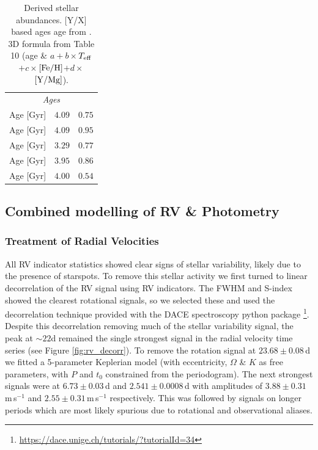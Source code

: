 \documentclass[fleqn,usenatbib]{mnras}
\newcommand{\ms}{m\,s$^{-1}$}
\newcommand{\teff}{$T_{\rm eff}$}
\newcommand{\feh}{\mbox{$\rm [Fe/H]$}}
\newcommand{\ymg}{\mbox{$\rm [Y/Mg]$}}
\begin{document}
\begin{table}
\begin{tabular}{lcc}
        \hline
        \multicolumn{3}{c}{\it Ages}\\
        [Y/Mg] Age [Gyr]  & $ 4.09 $ & $ 0.75 $ \\
        [Y/Ti] Age [Gyr]  & $ 4.09 $ & $ 0.95 $ \\
        [Y/Zn] Age [Gyr]  & $ 3.29 $ & $ 0.77 $ \\
        [Y/Si] Age [Gyr]  & $ 3.95 $ & $ 0.86 $ \\
        [Y/Al] Age [Gyr]  & $ 4.00 $ & $ 0.54 $ \\
        \hline
        \hline
    \end{tabular}
    \caption{Derived stellar abundances. [Y/X] based ages age from \citet{Delgado-19}. 3D formula from Table 10 (age \&  $a + b \times$\teff{}$+ c \times$\feh{}$ + d \times$\ymg{}).}
    \label{tab:abunds}
\end{table}


\subsection{Combined modelling of RV \& Photometry}

\subsubsection{Treatment of Radial Velocities}
All RV indicator statistics showed clear signs of stellar variability, likely due to the presence of starspots.
To remove this stellar activity we first turned to linear decorrelation of the RV signal using RV indicators.
The FWHM and S-index showed the clearest rotational signals, so we selected these and used the decorrelation technique provided with the DACE spectroscopy python package \citep{2015ASPC..495....7B}\footnote{\url{https://dace.unige.ch/tutorials/?tutorialId=34}}.
Despite this decorrelation removing much of the stellar variability signal, the peak at $\sim22$d remained the single strongest signal in the radial velocity time series (see Figure \ref{fig:rv_decorr}).
To remove the rotation signal at $23.68\pm0.08$\,d we fitted a 5-parameter Keplerian model (with eccentricity, $\Omega$ \& $K$ as free parameters, with $P$ and $t_0$ constrained from the periodogram).
The next strongest signals were at $6.73\pm0.03$\,d and $2.541\pm0.0008$\,d with amplitudes of $3.88\pm0.31$\,\ms{} and $2.55\pm0.31$\,\ms{} respectively. This was followed by signals on longer periods which are most likely spurious due to rotational and observational aliases.
\end{document}
